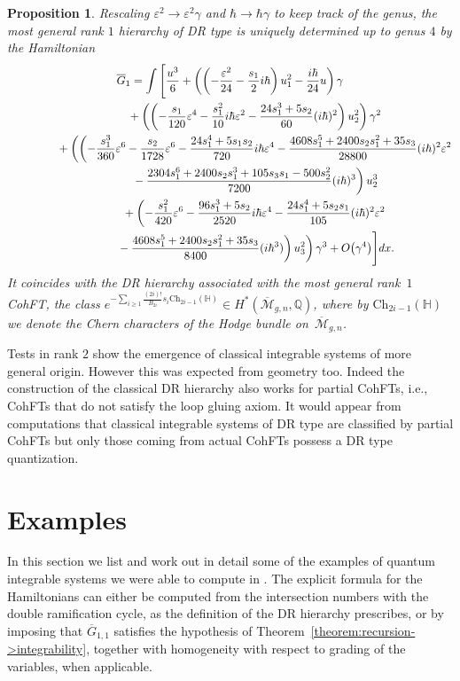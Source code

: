 \documentclass[pdftex]{sigma}
\numberwithin{equation}{section}
\newtheorem{Proposition}[Theorem]{Proposition}
 { \theoremstyle{definition}
\newtheorem{Remark}[Theorem]{Remark} }
\newcommand{\oM}{\overline{\mathcal M}}
\def\mbQ{{\mathbb Q}}
\newcommand{\<}{\left<}
\renewcommand{\>}{\right>}
\newcommand{\eps}{\varepsilon}
\newcommand{\Ch}{\mathrm{Ch}}
\newcommand{\oG}{{\overline G}}
\begin{document}
\begin{Proposition}
Rescaling $\eps^2\to\eps^2 \gamma$ and $\hbar \to \hbar \gamma$ to keep track of the genus, the most general rank $1$ hierarchy of DR type is uniquely determined up to genus $4$ by the Hamiltonian
\begin{gather*}
\oG_1=\int \Bigg[\frac{u^3}{6}+\left(\left(-\frac{\eps ^2}{24}-\frac{s_1}{2} i\hbar\right)u_1^2-\frac{i \hbar}{24} u\right)\gamma \\
\hphantom{\oG_1=\int \Bigg[}{} +\left(\left(-\frac{s_1}{120} \eps ^4-\frac{s_1^2}{10} i\hbar\eps ^2 -\frac{24 s_1^3 +5 s_2}{60} (i\hbar) ^2\right)u_2^2\right)\gamma^2\\
\hphantom{\oG_1=\int \Bigg[}{}
+\left(\left( -\frac{s_1^3}{360} \eps^6-\frac{s_2}{1728}\eps^6- \frac{24 s_1^4 +5 s_1 s_2 }{720}i \hbar \eps^4-\frac{4608 s_1^5 +2400 s_2 s_1^2 +35 s_3 }{28800}(i\hbar)^2\eps ^2\!\right.\right.\\
\left.\hphantom{\oG_1=\int \Bigg[}{} -\frac{2304 s_1^6+2400 s_2 s_1^3+105 s_3 s_1-500 s_2^2 }{7200}(i\hbar)^3\right)u_2^3 \\
\hphantom{\oG_1=\int \Bigg[}{}
+\left(-\frac{s_1^2}{420} \eps ^6-\frac{96 s_1^3+5 s_2}{2520}i \hbar \eps^4 - \frac{24 s_1^4+5 s_2 s_1}{105}(i\hbar)^2\eps^2\right.\\
\left. \left. \hphantom{\oG_1=\int \Bigg[}{}
 -\frac{4608 s_1^5+2400 s_2 s_1^2+35 s_3 }{8400}(i\hbar ^3)\right)u_3^2\right)\gamma^3 +O\big(\gamma^4\big)\Bigg]dx.
\end{gather*}
It coincides with the DR hierarchy associated with the most general rank~$1$ CohFT, the class $e^{-\sum\limits_{i\ge 1}\frac{(2i)!}{B_{2i}}s_i\Ch_{2i-1}(\mathbb H)} \in H^*(\oM_{g,n},\mbQ)$, where by $\Ch_{2i-1}(\mathbb H)$ we denote the Chern characters of the Hodge bundle on~$\oM_{g,n}$.
\end{Proposition}

Tests in rank $2$ show the emergence of classical integrable systems of more general origin. However this was expected from geometry too. Indeed the construction of the classical DR hierarchy also works for partial CohFTs, i.e., CohFTs that do not satisfy the loop gluing axiom. It would appear from computations that classical integrable systems of DR type are classif\/ied by partial CohFTs but only those coming from actual CohFTs possess a DR type quantization.

\section{Examples}\label{section:examples}
In this section we list and work out in detail some of the examples of quantum integrable systems we were able to compute in \cite{Bur15,BDGR16a,BDGR16b,BG15,BR15,BR14}. The explicit formula for the Hamiltonians can either be computed from the intersection numbers with the double ramif\/ication cycle, as the def\/inition of the DR hierarchy prescribes, or by imposing that $\oG_{1,1}$ satisf\/ies the hypothesis of Theorem~\ref{theorem:recursion->integrability}, together with homogeneity with respect to grading of the variables, when applicable.
\end{document}
